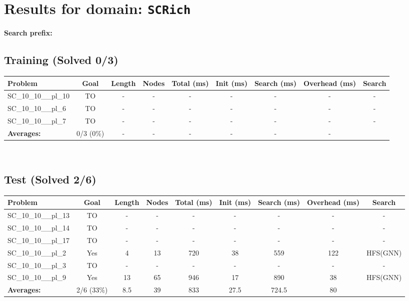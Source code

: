 \documentclass{article}
\begin{document}
\section*{Results for domain: \texttt{SCRich}}
\textbf{Search prefix:} 
\\[0.5cm]
\subsection*{Training (Solved 0/3)}
\begin{tabular}{lcccccccc}
\toprule
Problem & Goal & Length & Nodes & Total (ms) & Init (ms) & Search (ms) & Overhead (ms) & Search \\
\midrule
SC\_10\_10\_\_pl\_10 & TO & - & - & - & - & - & - & - \\
SC\_10\_10\_\_pl\_6 & TO & - & - & - & - & - & - & - \\
SC\_10\_10\_\_pl\_7 & TO & - & - & - & - & - & - & - \\
\textbf{Averages:} & 0/3 (0\%) & - & - & - & - & - & - & \\
\bottomrule
\end{tabular}
\\[0.7cm]
\subsection*{Test (Solved 2/6)}
\begin{tabular}{lcccccccc}
\toprule
Problem & Goal & Length & Nodes & Total (ms) & Init (ms) & Search (ms) & Overhead (ms) & Search \\
\midrule
SC\_10\_10\_\_pl\_13 & TO & - & - & - & - & - & - & - \\
SC\_10\_10\_\_pl\_14 & TO & - & - & - & - & - & - & - \\
SC\_10\_10\_\_pl\_17 & TO & - & - & - & - & - & - & - \\
SC\_10\_10\_\_pl\_2 & Yes & 4 & 13 & 720 & 38 & 559 & 122 & HFS(GNN) \\
SC\_10\_10\_\_pl\_3 & TO & - & - & - & - & - & - & - \\
SC\_10\_10\_\_pl\_9 & Yes & 13 & 65 & 946 & 17 & 890 & 38 & HFS(GNN) \\
\textbf{Averages:} & 2/6 (33\%) & 8.5 & 39 & 833 & 27.5 & 724.5 & 80 & \\
\bottomrule
\end{tabular}
\\[0.7cm]
\end{document}
